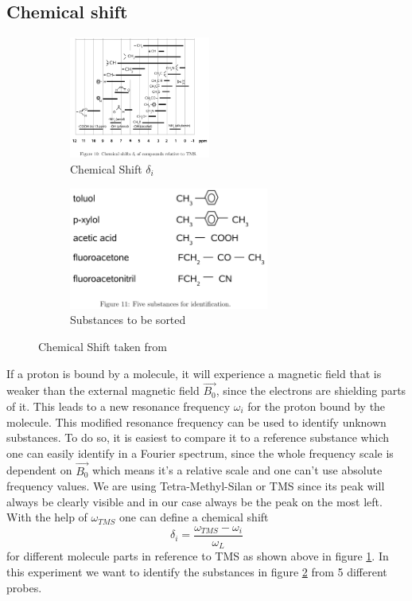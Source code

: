 \subsection{Chemical shift}\label{chemShift}
\begin{figure}[h]
	\begin{subfigure}{0.5\textwidth}
	\centering
	\includegraphics[width=0.7\linewidth ,height=4cm]{images/ChemShift.png}
	\caption{Chemical Shift $\delta_i$}
	\label{shi1}
	\end{subfigure}
	\begin{subfigure}{0.5\textwidth}
	\includegraphics[width=0.7\linewidth ,height=4cm]{images/substances.png}
	\caption{Substances to be sorted}
	\label{shi2}
	\end{subfigure}
	\caption{Chemical Shift taken from \cite{manual}}
	\label{shi3}
\end{figure}
If a proton is bound by a molecule, it will experience a magnetic field that is weaker than the external magnetic field $\vec{B_0}$, since the electrons are shielding parts of it. This leads to a new resonance frequency $\omega_i$ for the proton bound by the molecule. This modified resonance frequency can be used to identify unknown substances. To do so, it is easiest to compare it to a reference substance which one can easily identify in a Fourier spectrum, since the whole frequency scale is dependent on $\vec{B_0}$ which means it's a relative scale and one can't use absolute frequency values. We are using Tetra-Methyl-Silan or TMS since its peak will always be clearly visible and in our case always be the peak on the most left. With the help of $\omega_{TMS}$ one can define a chemical shift
\begin{equation}\label{deltashift}
	\delta_i = \frac{\omega_{TMS}-\omega_{i}}{\omega_{L}}
\end{equation} 
for different molecule parts in reference to TMS as shown above in figure \ref{shi1}. In this experiment we want to identify the substances in figure \ref{shi2} from 5 different probes. \\
